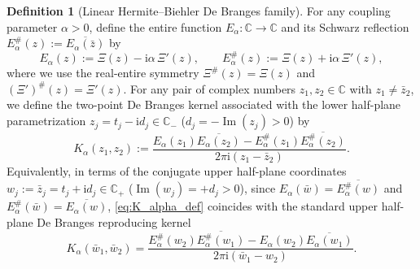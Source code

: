 \documentclass[11pt,reqno,a4paper]{amsart}
\theoremstyle{plain}
\theoremstyle{definition}
\newtheorem{definition}[theorem]{Definition}
\theoremstyle{remark}
\numberwithin{equation}{section}
\newcommand{\ii}{\mathrm{i}}
\begin{document}
\begin{definition}[Linear Hermite--Biehler De Branges family]\label{def:debranges_family}
For any coupling parameter $\alpha > 0$, define the entire function $E_\alpha : \mathbb{C} \to \mathbb{C}$ and its Schwarz reflection $E_\alpha^\#(z) := \overline{E_\alpha(\bar{z})}$ by
\begin{equation}\label{eq:E_alpha_def}
  E_\alpha(z) := \Xi(z) - \ii\alpha\,\Xi'(z), \qquad
  E_\alpha^\#(z) := \Xi(z) + \ii\alpha\,\Xi'(z),
\end{equation}
where we use the real-entire symmetry $\Xi^\#(z) = \Xi(z)$ and $(\Xi')^\#(z) = \Xi'(z)$. For any pair of complex numbers $z_1, z_2 \in \mathbb{C}$ with $z_1 \neq \bar{z}_2$, we define the two-point De Branges kernel associated with the lower half-plane parametrization $z_j = t_j - \ii d_j \in \mathbb{C}_-$ ($d_j = -\operatorname{Im}(z_j) > 0$) by
\begin{equation}\label{eq:K_alpha_def}
  K_\alpha(z_1, z_2) := \frac{E_\alpha(z_1)\overline{E_\alpha(z_2)} - E_\alpha^\#(z_1)\overline{E_\alpha^\#(z_2)}}{2\pi\ii(z_1 - \bar{z}_2)}.
\end{equation}
Equivalently, in terms of the conjugate upper half-plane coordinates $w_j := \bar{z}_j = t_j + \ii d_j \in \mathbb{C}_+$ ($\operatorname{Im}(w_j) = +d_j > 0$), since $E_\alpha(\bar{w}) = \overline{E_\alpha^\#(w)}$ and $E_\alpha^\#(\bar{w}) = \overline{E_\alpha(w)}$, \eqref{eq:K_alpha_def} coincides with the standard upper half-plane De Branges reproducing kernel \cite[Ch.~2]{deBranges1968}
\begin{equation}\label{eq:K_alpha_upper}
  K_\alpha(\bar{w}_1, \bar{w}_2) = \frac{E_\alpha^\#(w_2)\overline{E_\alpha^\#(w_1)} - E_\alpha(w_2)\overline{E_\alpha(w_1)}}{2\pi\ii(\bar{w}_1 - w_2)}.
\end{equation}
\end{definition}
\end{document}
